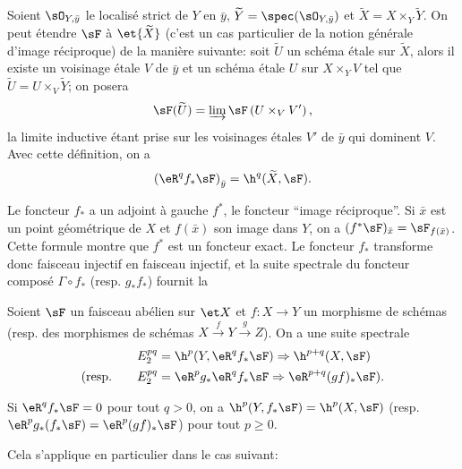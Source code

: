 Soient $\sO_{Y,\bar y}$ le localisé strict de $Y$ en $\bar y$, 
$\widetilde Y=\spec(\sO_{Y,\bar y})$ et $\widetilde X=X\times_Y \widetilde Y$. 
On peut étendre $\sF$ à $\et{\widetilde X}$ (c'est un cas particulier de la 
notion générale d'image réciproque) de la manière suivante: soit 
$\widetilde U$ un schéma étale sur $\widetilde X$, alors il existe un 
voisinage étale $V$ de $\bar y$ et un schéma étale $U$ sur $X\times_Y V$ tel 
que $\widetilde U=U\times_V \widetilde Y$; on posera 
\[
  \sF(\widetilde U)=\varinjlim \sF\left(U\times_V V'\right)\text{,}
\]
la limite inductive étant prise sur les voisinages étales $V'$ de $\bar y$ qui 
dominent $V$. Avec cette définition, on a 
\[
  \left(\eR^q f_* \sF\right)_{\bar y} = \h^q(\widetilde X,\sF)\text{.}
\]

Le foncteur $f_*$ a un adjoint à gauche $f^*$, le foncteur ``image 
réciproque''. Si $\bar x$ est un point géométrique de $X$ et $f(\bar x)$ son 
image dans $Y$, on a $(f^* \sF)_{\bar x} = \sF_{f(\bar x)}$. Cette formule montre 
que $f^*$ est un foncteur exact. Le foncteur $f_*$ transforme donc faisceau 
injectif en faisceau injectif, et la suite spectrale du foncteur composé 
$\Gamma\circ f_*$ (resp. $g_* f_*$) fournit la 





\begin{sourcenamedfirstdotdash}\label{I:2-3-4}
Soient $\sF$ un faisceau abélien sur $\et X$ et $f:X\to Y$ un morphisme de 
schémas (resp. des morphismes de schémas $X\xrightarrow f Y \xrightarrow g Z$). 
On a une suite spectrale 
\begin{align*}
  E_2^{pq} &= \h^p(Y,\eR^q f_* \sF) \Rightarrow \h^{p+q}(X,\sF) \\
  \text{(resp.}\qquad E_2^{pq} &= \eR^p g_* \eR^q f_* \sF \Rightarrow \eR^{p+q}(gf)_* \sF\text{).}
\end{align*}
\end{sourcenamedfirstdotdash}





\begin{corollarydotdash}\label{I:2-3-5}
Si $\eR^q f_* \sF=0$ pour tout $q>0$, on a $\h^p(Y,f_* \sF)=\h^p(X,\sF)$ (resp. 
$\eR^p g_*(f_* \sF) = \eR^p(g f)_* \sF$) pour tout $p\geqslant 0$. 
\end{corollarydotdash}

Cela s'applique en particulier dans le cas suivant:






